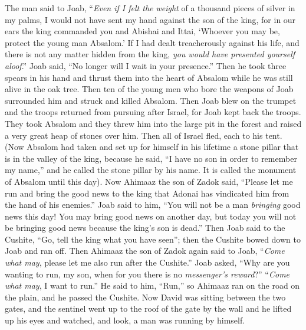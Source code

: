 \begin{biblechapter}
\verse The man said to Joab, “\textit{Even if I felt the weight} of a thousand pieces of silver in my palms, I would not have sent my hand against the son of the king, for in our ears the king commanded you and Abishai and Ittai, ‘Whoever you may be, protect the young man Absalom.’
\verse If I had dealt treacherously against his life, and there is not any matter hidden from the king, \textit{you would have presented yourself aloof}.”
\verse Joab said, “No longer will I wait in your presence.” Then he took three spears in his hand and thrust them into the heart of Absalom while he was still alive in the oak tree.
\verse Then ten of the young men who bore the weapons of Joab surrounded him and struck and killed Absalom.
\verse Then Joab blew on the trumpet and the troops returned from pursuing after Israel, for Joab kept back the troops.
\verse They took Absalom and they threw him into the large pit in the forest and raised a very great heap of stones over him. Then all of Israel fled, each to his tent.
\verse (Now Absalom had taken and set up for himself in his lifetime a stone pillar that is in the valley of the king, because he said, “I have no son in order to remember my name,” and he called the stone pillar by his name. It is called the monument of Absalom until this day).
\verse Now Ahimaaz the son of Zadok said, “Please let me run and bring the good news to the king that Adonai has vindicated him from the hand of his enemies.”
\verse Joab said to him, “You will not be a man \textit{bringing} good news this day! You may bring good news on another day, but today you will not be bringing good news because the king’s son is dead.”
\verse Then Joab said to the Cushite, “Go, tell the king what you have seen”; then the Cushite bowed down to Joab and ran off.
\verse Then Ahimaaz the son of Zadok again said to Joab, “\textit{Come what may}, please let me also run after the Cushite.” Joab asked, “Why are you wanting to run, my son, when for you there is no \textit{messenger’s reward}?”
\verse “\textit{Come what may}, I want to run.” He said to him, “Run,” so Ahimaaz ran on the road on the plain, and he passed the Cushite.
\verse Now David was sitting between the two gates, and the sentinel went up to the roof of the gate by the wall and he lifted up his eyes and watched, and look, a man was running by himself.

\end{biblechapter}
